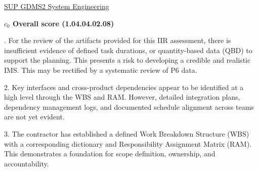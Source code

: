 % 


\begin{frame}{\href{run:../local/source-docs/1.04.04.02.08.pdf}{SUP GDMS2 System Engineering}}
\centering
{}
\par
\vspace{0.75em}
\textbf{\small{\(c_0\) Overall score {\tiny (1.04.04.02.08)}}}\\\par
\vspace{0.5em}
\begin{minipage}{0.85\textwidth}
\raggedright
\fontsize{7}{9}. For the review of the artifacts provided for this IIR assessment, there is insufficient evidence of defined task durations, or quantity-based data (QBD) to support the planning. This presents a risk to developing a credible and realistic IMS. This may be rectified by a systematic review of P6 data.\par\vspace{0.5em}2. Key interfaces and cross-product dependencies appear to be identified at a high level through the WBS and RAM. However, detailed integration plans, dependency management logs, and documented schedule alignment across teams are not yet evident.\par\vspace{0.5em}3. The contractor has established a defined Work Breakdown Structure (WBS) with a corresponding dictionary and Responsibility Assignment Matrix (RAM). This demonstrates a foundation for scope definition, ownership, and accountability.\par
\end{minipage}
\end{frame}
